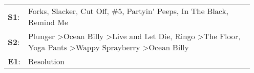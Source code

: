 \begin{supertabular}{p{0.03\textwidth}p{0.92\textwidth}}
 \textbf{S1}:  &                                                                                                                       Forks\textsuperscript{}, \enspace Slacker\textsuperscript{}, \enspace Cut Off\textsuperscript{}, \enspace \#5\textsuperscript{}, \enspace Partyin' Peeps\textsuperscript{}, \enspace In The Black\textsuperscript{}, \enspace Remind Me\textsuperscript{}  \enspace  \\
 \textbf{S2}:  &  Plunger\textsuperscript{} \textgreater \enspace Ocean Billy\textsuperscript{} \textgreater \enspace Live and Let Die\textsuperscript{}, \enspace Ringo\textsuperscript{} \textgreater \enspace The Floor\textsuperscript{}, \enspace Yoga Pants\textsuperscript{} \textgreater \enspace Wappy Sprayberry\textsuperscript{} \textgreater \enspace Ocean Billy\textsuperscript{}  \enspace  \\
 \textbf{E1}:  &                                                                                                                                                                                                                                                                                                                                                    Resolution\textsuperscript{}  \enspace  \\
\end{supertabular}
